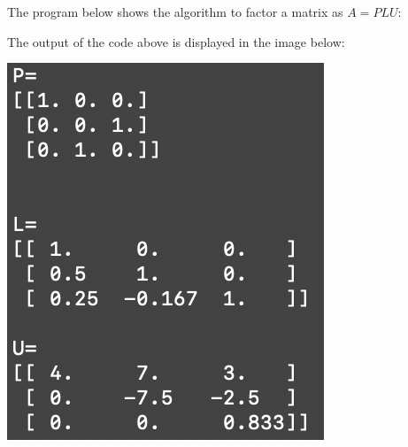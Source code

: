 The program below shows the algorithm to factor a matrix as $A = PLU$:


The output of the code above is displayed in the image below:

\begin{center}
    \includegraphics{prob5.png} 
\end{center}



